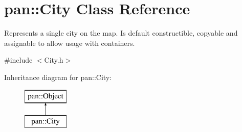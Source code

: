 \hypertarget{classpan_1_1_city}{}\section{pan\+:\+:City Class Reference}
\label{classpan_1_1_city}


Represents a single city on the map. Is default constructible, copyable and assignable to allow usage with containers.  




{\ttfamily \#include $<$City.\+h$>$}

Inheritance diagram for pan\+:\+:City\+:\begin{figure}[H]
\begin{center}
\leavevmode
\includegraphics[height=2.000000cm]{classpan_1_1_city}
\end{center}
\end{figure}

